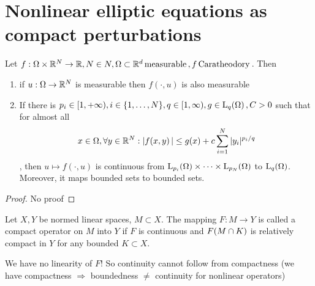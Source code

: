 \documentclass{article}
\begin{document}
\section{Nonlinear elliptic equations as compact perturbations}
\label{sec:nonlinear_elliptic_compact}

\begin{theorem}[Nemytskii]
	Let $f: \Omega \times {\mathbb R}^N \to {\mathbb R}, N \in N, \Omega \subset {\mathbb R}^d \, \text{measurable} \,, f \, \text{Caratheodory} \,$. Then
	\begin{enumerate}
		\item if $u: \Omega \to {\mathbb R}^N$ is measurable then $f(\cdot, u)$ is also measurable
		\item If there is $p_i \in [1, +\infty), i \in \{1,\dots,N\}, q \in [1, \infty), g \in \LpSet[q]{\Omega}, C>0$ such that for almost all
			\[
				x \in \Omega, \forall y \in {\mathbb R}^N: |f\qty(x,y)| \leq g(x) + c \sum_{i=1}^N |y_i|^{p_i/q}
			\]
			, then $u \mapsto f(\cdot, u)$ is continuous from $\LpSet[p_i]{\Omega} \times \dots \times \LpSet[p_N]{\Omega}$ to $\LpSet[q]{\Omega}$. Moreover, it maps bounded sets to bounded sets.
	\end{enumerate}
\end{theorem}
\begin{proof}
	No proof
\end{proof}

\begin{definition}
	Let $X,Y$ be normed linear spaces, $M \subset X.$ The mapping $F:M \to Y$ is called a compact operator on $M$ into $Y$ if $F$ is continuous and $F\qty(M \cap K)$ is relatively compact in $Y$ for any bounded $K \subset X.$
\end{definition}

\begin{remark}
	We have no linearity of $F$! So continuity cannot follow from compactness (we have compactness $\Rightarrow $ boundedness $\neq$ continuity for nonlinear operators)
\end{remark}
\end{document}
